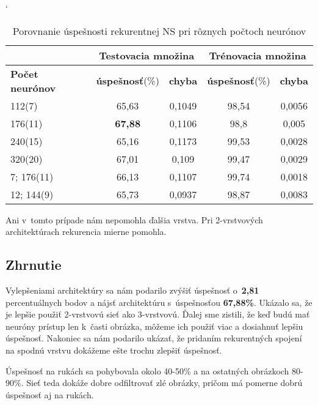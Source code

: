 \begin{table}[htp]
\catcode` %
\centering
\begin{tabular}{|l|c|c|c|c|}
\cline{2-5}
\multicolumn{1}{l}{} & \multicolumn{2}{|c|}{\textbf{Testovacia množina}} & \multicolumn{2}{c|}{\textbf{Trénovacia množina}}\\ 
\hline
\textbf{Počet neurónov} & \textbf{úspešnosť}(\%) & \textbf{chyba} & \textbf{úspešnosť}(\%) & \textbf{chyba} \\ \hline
112(7) & 65,63 & 0,1049 & 98,54 & 0,0056  \\ \hline
176(11) & \textbf{67,88} & 0,1106 & 98,8 & 0,005  \\ \hline
240(15) & 65,16 & 0,1173 & 99,53 & 0,0028  \\ \hline
320(20) & 67,01 & 0,109 & 99,47 & 0,0029 \\ \hline
7; 176(11) & 66,13 & 0,1107 & 99,74 & 0,0018 \\ \hline
12; 144(9) & 65,73 & 0,0937 & 98,87 & 0,0083 \\ \hline
\end{tabular}
\caption{Porovnanie úspešnosti rekurentnej NS pri rôznych počtoch neurónov}
\label{tab:neuroncountcmp3}
\end{table}

Ani v~tomto prípade nám nepomohla ďalšia vrstva. Pri 2-vrstvových architektúrach rekurencia mierne pomohla.

\subsection{Zhrnutie}

Vylepšeniami architektúry sa nám podarilo zvýšiť úspešnosť o~\textbf{2,81} percentuálnych bodov a nájsť architektúru s~úspešnosťou \textbf{67,88\%}. Ukázalo sa, že je lepšie použiť 2-vrstvovú sieť ako 3-vrstvovú. Ďalej sme zistili, že keď budú mať neuróny prístup len k~časti obrázka, môžeme ich použiť viac a dosiahnuť lepšiu úspešnosť. Nakoniec sa nám podarilo ukázať, že pridaním rekurentných spojení na spodnú vrstvu dokážeme ešte trochu zlepšiť úspešnosť.

Úspešnosť na rukách sa pohybovala okolo 40-50\% a na ostatných obrázkoch 80-90\%. Sieť teda dokáže dobre odfiltrovať zlé obrázky, pričom má pomerne dobrú úspešnosť aj na rukách.

